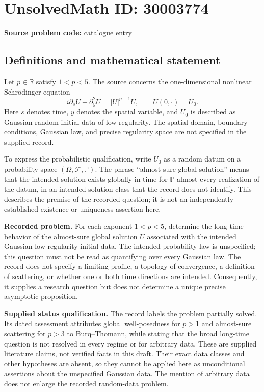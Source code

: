 \documentclass[11pt]{article}
\newcommand{\R}{\mathbb{R}}
\begin{document}
\section*{UnsolvedMath ID: 30003774}
\textbf{Source problem code:} catalogue entry
\subsection{Definitions and mathematical statement}
Let \(p\in\R\) satisfy \(1<p<5\). The source concerns the one-dimensional nonlinear Schrödinger equation
\[
 i\partial_s U+\partial_y^2U=|U|^{p-1}U,
 \qquad U(0,\cdot)=U_0.
\]
Here \(s\) denotes time, \(y\) denotes the spatial variable, and \(U_0\) is described as Gaussian random initial data of low regularity. The spatial domain, boundary conditions, Gaussian law, and precise regularity space are not specified in the supplied record.

To express the probabilistic qualification, write \(U_0\) as a random datum on a probability space \((\Omega,\mathcal F,\mathbb P)\). The phrase ``almost-sure global solution'' means that the intended solution exists globally in time for \(\mathbb P\)-almost every realization of the datum, in an intended solution class that the record does not identify. This describes the premise of the recorded question; it is not an independently established existence or uniqueness assertion here.

\textbf{Recorded problem.} For each exponent \(1<p<5\), determine the long-time behavior of the almost-sure global solution \(U\) associated with the intended Gaussian low-regularity initial data. The intended probability law is unspecified; this question must not be read as quantifying over every Gaussian law. The record does not specify a limiting profile, a topology of convergence, a definition of scattering, or whether one or both time directions are intended. Consequently, it supplies a research question but does not determine a unique precise asymptotic proposition.

\textbf{Supplied status qualification.} The record labels the problem partially solved. Its dated assessment attributes global well-posedness for \(p>1\) and almost-sure scattering for \(p>3\) to Burq--Thomann, while stating that the broad long-time question is not resolved in every regime or for arbitrary data. These are supplied literature claims, not verified facts in this draft. Their exact data classes and other hypotheses are absent, so they cannot be applied here as unconditional assertions about the unspecified Gaussian data. The mention of arbitrary data does not enlarge the recorded random-data problem.
\end{document}
